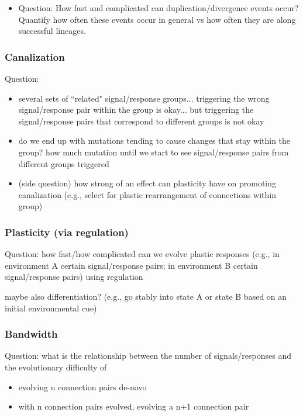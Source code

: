 \begin{itemize}
  \item Question: How fast and complicated can duplication/divergence events occur?
        Quantify how often these events occur in general vs how often they are along
        successful lineages.
\end{itemize}

\subsubsection{Canalization}

Question:
\begin{itemize}
\item several sets of ``related" signal/response groups... triggering the wrong signal/response pair within the group is okay... but triggering the signal/response pairs that correspond to different groups is not okay
\item do we end up with mutations tending to cause changes that stay within the group? how much mutation until we start to see signal/response pairs from different groups triggered
\item (side question) how strong of an effect can plasticity have on promoting canalization (e.g., select for plastic rearrangement of connections within group)
\end{itemize}

\subsubsection{Plasticity (via regulation)}

Question: how fast/how complicated can we evolve plastic responses (e.g., in environment A certain signal/response pairs; in environment B certain signal/response pairs) using regulation

maybe also differentiation?
(e.g., go stably into state A or state B based on an initial environmental cue)

\subsubsection{Bandwidth}

Question: what is the relationship between the number of signals/responses and the evolutionary difficulty of
\begin{itemize}
\item evolving n connection pairs de-novo
\item with n connection pairs evolved, evolving a n+1 connection pair
\end{itemize}

